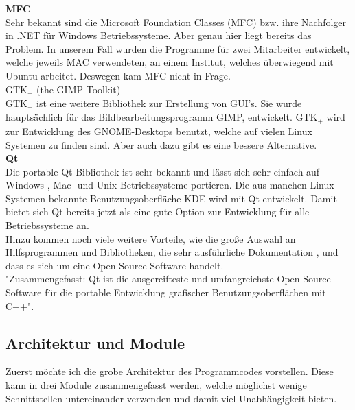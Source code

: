 \documentclass[11pt, a4paper, german]{article}
\theoremstyle{plain}
\begin{document}
	\textbf{MFC}\\
	Sehr bekannt sind die Microsoft Foundation Classes (MFC) bzw. ihre Nachfolger in .NET für Windows Betriebssysteme. Aber genau hier liegt bereits das Problem. In unserem Fall wurden die Programme für zwei Mitarbeiter entwickelt, welche jeweils MAC verwendeten, an einem Institut, welches überwiegend mit Ubuntu arbeitet. Deswegen kam MFC nicht in Frage.\\
	
	\textbf{$ \text{GTK}_+ $ }(the GIMP Toolkit)\\
	$ \text{GTK}_+ $ ist eine weitere Bibliothek zur Erstellung von GUI's. Sie wurde haupt\-sächlich für das Bildbearbeitungsprogramm GIMP, entwickelt. $ \text{GTK}_+ $ wird zur Entwicklung des GNOME-Desktops benutzt, welche auf vielen Linux Systemen zu finden sind. Aber auch dazu gibt es eine bessere Alternative.\\
	
	\textbf{Qt}\\
	Die portable Qt-Bibliothek ist sehr bekannt und lässt sich sehr einfach auf Windows-, Mac- und Unix-Betriebssysteme portieren. Die aus manchen Linux-Systemen bekannte Benutzungsoberfläche KDE wird mit Qt entwickelt. Damit bietet sich Qt bereits jetzt als eine gute Option zur Entwicklung für alle Betriebssysteme an.\\
	Hinzu kommen noch viele weitere Vorteile, wie die große Auswahl an Hilfsprogrammen und Bibliotheken, die sehr ausführliche Dokumentation , und dass es sich um eine Open Source Software handelt.\\
	"{}Zusammengefasst: Qt ist die ausgereifteste und umfangreichste Open Source Software für die portable Entwicklung grafischer Benutzungsoberflächen mit C++"{}\cite[S.452]{breymann2011c++}.

	\subsection{Architektur und Module}
	Zuerst möchte ich die grobe Architektur des Programmcodes vorstellen. Diese kann in drei Module zusammengefasst werden, welche möglichst wenige Schnittstellen untereinander verwenden und damit viel Unabhängigkeit bieten.
	
\end{document}
